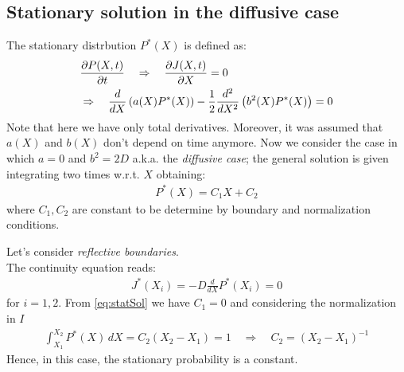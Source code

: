 \documentclass[4apaper,11pt,fleqn]{article}
\theoremstyle{remark}
\theoremstyle{definition}
\begin{document}
\subsection{Stationary solution in the diffusive case}
The stationary distrbution $P^{*}(X)$ is defined as:
\begin{align}
  \label{eq:dx_flux}
  &\frac{\partial P(X, t)}{\partial t} \quad \Rightarrow \quad \frac{\partial J(X, t)}{\partial X}=0 \\ \notag
  &\Rightarrow \quad \frac{d}{d X}\left(a(X) P^{*}(X)\right)-\frac{1}{2} \frac{d^{2}}{d X^{2}}\left(b^{2}(X) P^{*}(X)\right)=0
\end{align}
Note that here we have only total derivatives. Moreover, it was assumed that $a(X)$ and $b(X)$ don't depend on time anymore.
Now we consider the case in which $a = 0$ and $b^2 =2D$ a.k.a. the \emph{diffusive case}; the general solution is given integrating two times w.r.t. $X$ obtaining:
\begin{align}
  \label{eq:statSol}
  P^*(X) = C_1 X + C_2
\end{align}
where $C_1, C_2$ are constant to be determine by boundary and normalization conditions.

Let's consider \emph{reflective boundaries}.\\
The continuity equation reads:
\begin{align*}
  J^* (X_i) = -D \frac{d }{d X} P^*(X_i) = 0
\end{align*}
for $i = 1,2$. From \eqref{eq:statSol} we have $C_1 = 0$ and considering the normalization in $I$
\begin{align*}
  \int_{X_1}^{X_2} P^* (X) \, dX = C_2 (X_2 - X_1) = 1 \quad \Rightarrow \quad C_2 = (X_2 - X_1)^{-1}
\end{align*}
Hence, in this case, the stationary probability is a constant.
\end{document}
